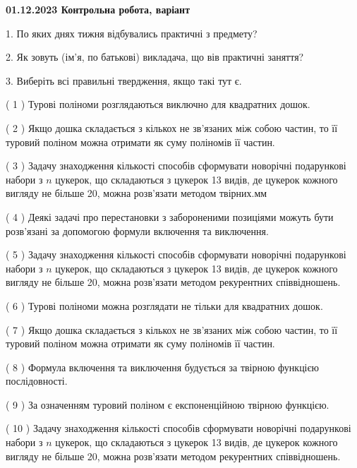 \documentclass[12pt, ukrainian]{article}
\begin{document}
\vspace{4mm}
\newpage
\begin {large}

\textbf{01.12.2023 Контрольна робота, варіант  }\par


{
1. По яких днях тижня відбувались практичні з предмету?



\vspace{5mm}
2. Як зовуть (ім'я, по батькові) викладача, що вів практичні заняття?



\vspace{5mm}
3. Виберіть всі правильні твердження, якщо такі тут є.\par
\vspace{2mm}
( 1 ) Турові поліноми розглядаються виключно для квадратних дошок.%

( 2 ) Якщо дошка складається з кількох не зв’язаних між собою частин, то її туровий поліном можна отримати як суму поліномів її частин.%

( 3 ) Задачу знаходження кількості способів сформувати новорічні подарункові набори з $n$ цукерок, що складаються з цукерок 13 видів, де цукерок кожного вигляду не більше 20, можна розв’язати методом твірних.мм%

( 4 ) Деякі задачі про перестановки з забороненими позиціями можуть бути розв’я\-за\-ні за допомогою формули включення та виключення.%

( 5 ) Задачу знаходження кількості способів сформувати новорічні подарункові набори з $n$ цукерок, що складаються з цукерок 13 видів, де цукерок кожного вигляду не більше 20, можна розв’язати методом рекурентних співвідношень.%

( 6 ) Турові поліноми можна розглядати не тільки для квадратних дошок.%

( 7 ) Якщо дошка складається з кількох не зв’язаних між собою частин, то її туровий поліном можна отримати як суму поліномів її частин.%

( 8 ) Формула включення та виключення будується за твірною функцією послідовності.%

( 9 ) За означенням туровий поліном є експоненційною твірною функцією.%

( 10 ) Задачу знаходження кількості способів сформувати новорічні подарункові набори з $n$ цукерок, що складаються з цукерок 13 видів, де цукерок кожного вигляду не більше 20, можна розв’язати методом рекурентних співвідношень.%
}
\end {large}
\end{document}
